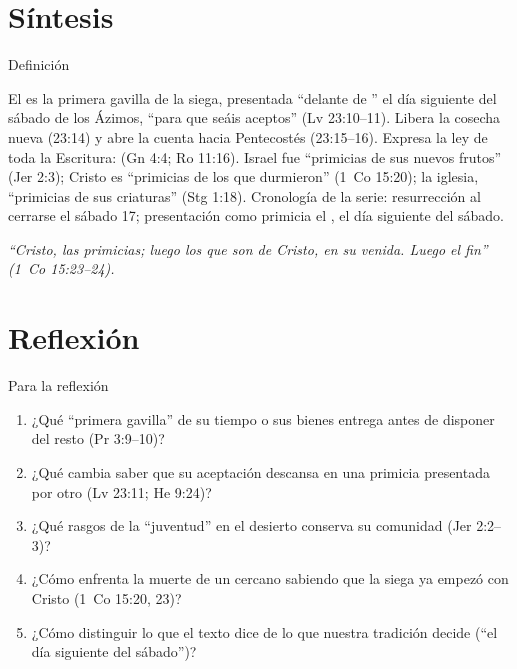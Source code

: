 \section{Síntesis}

\begin{frame}{Definición}
\begin{tcolorbox}[colback=papiro,colframe=tierraroja,boxrule=1pt,arc=3pt,fontupper=\small]
\RaggedRight El  es la primera gavilla de la siega, presentada ``delante de \SENOR'' el día siguiente del sábado de los Ázimos, ``para que seáis aceptos'' (Lv 23:10--11). Libera la cosecha nueva (23:14) y abre la cuenta hacia Pentecostés (23:15--16). Expresa la ley de toda la Escritura:  (Gn 4:4; Ro 11:16). Israel fue ``primicias de sus nuevos frutos'' (Jer 2:3); Cristo es ``primicias de los que durmieron'' (1~Co 15:20); la iglesia, ``primicias de sus criaturas'' (Stg 1:18). Cronología de la serie: resurrección al cerrarse el sábado 17; presentación como primicia el , el día siguiente del sábado.
\end{tcolorbox}
\centering\small\itshape ``Cristo, las primicias; luego los que son de Cristo, en su venida. Luego el fin'' (1~Co 15:23--24).
\end{frame}


\section{Reflexión}

\begin{frame}{Para la reflexión}
\small\RaggedRight
\begin{enumerate}
\item ¿Qué ``primera gavilla'' de su tiempo o sus bienes entrega antes de disponer del resto (Pr 3:9--10)?
\item ¿Qué cambia saber que su aceptación descansa en una primicia presentada por otro (Lv 23:11; He 9:24)?
\item ¿Qué rasgos de la ``juventud'' en el desierto conserva su comunidad (Jer 2:2--3)?
\item ¿Cómo enfrenta la muerte de un cercano sabiendo que la siega ya empezó con Cristo (1~Co 15:20, 23)?
\item ¿Cómo distinguir lo que el texto dice de lo que nuestra tradición decide (``el día siguiente del sábado'')?
\end{enumerate}
\end{frame}

